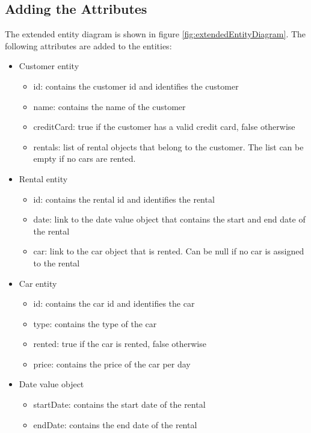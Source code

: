 \subsection*{Adding the Attributes}
The extended entity diagram is shown in figure \ref{fig:extendedEntityDiagram}.
The following attributes are added to the entities:
\begin{itemize}
    \item Customer entity
    \begin{itemize}
        \item id: contains the customer id and identifies the customer
        \item name: contains the name of the customer
        \item creditCard: true if the customer has a valid credit card, false otherwise
        \item rentals: list of rental objects that belong to the customer. The list can be empty if no cars are rented.
    \end{itemize}
    \item Rental entity
    \begin{itemize}
        \item id: contains the rental id and identifies the rental
        \item date: link to the date value object that contains the start and end date of the rental
        \item car: link to the car object that is rented. Can be null if no car is assigned to the rental
    \end{itemize}
    \item Car entity
    \begin{itemize}
        \item id: contains the car id and identifies the car
        \item type: contains the type of the car
        \item rented: true if the car is rented, false otherwise
        \item price: contains the price of the car per day
    \end{itemize}
    \item Date value object
    \begin{itemize}
        \item startDate: contains the start date of the rental
        \item endDate: contains the end date of the rental
    \end{itemize}
\end{itemize}

